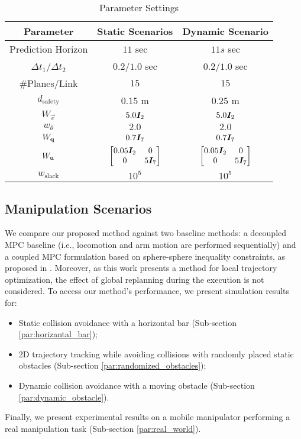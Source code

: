\begin{table}[ht]
  \centering
  \caption{Parameter Settings}
  \label{tab:parameters}
  \begin{tabular}{|c|c|c|}
  \hline
  Parameter & Static Scenarios & Dynamic Scenario\\
  \hline
  Prediction Horizon & $11$ sec & $11s$ sec\\
  \hline
  $\Delta t_1$/$\Delta t_2$ & $0.2$/$1.0$ sec & $0.2$/$1.0$ sec\\
  \hline
  \#Planes/Link & $15$ & $15$ \\
  \hline
  $d_{\textrm{safety}}$ & $0.15$ m & $0.25$ m \\
  \hline
  $W_{\vec{e}}$ & $5.0\bm{I}_2$ & $5.0\bm{I}_2$\\
  \hline
  $w_{\theta}$ & $2.0$ & $2.0$\\
  \hline
  $W_{\mathbf{q}}$ & $0.7 \bm{I}_7$ & $0.7 \bm{I}_7$ \\
  \hline
  $W_{\mathbf{u}}$ & $\begin{bmatrix} 0.05\bm{I}_2 & 0 \\ 0 & 5\bm{I}_7 \end{bmatrix}$ &
  $\begin{bmatrix} 0.05\bm{I}_2 & 0 \\ 0 & 5\bm{I}_7 \end{bmatrix}$ \\
  \hline
  $w_{\textrm{slack}}$ & $10^{5}$ & $10^{5}$\\
  \hline
  \end{tabular}
\end{table}
%
%
\subsection{Manipulation Scenarios}%
\label{sub:environment_setup}

We compare our proposed method against two baseline methods: a decoupled MPC baseline (i.e., locomotion and arm motion are performed sequentially) and a coupled MPC formulation based on sphere-sphere inequality constraints, as proposed in \cite{Avanzini2018}. Moreover, as this work presents a method for local trajectory optimization, the effect of global replanning during the execution is not considered. To access our method's performance, we present simulation results for:
\begin{itemize}
    \item Static collision avoidance with a horizontal bar \cite{Avanzini2018} (Sub-section \ref{par:horizantal_bar});
    \item 2D trajectory tracking while avoiding collisions with randomly placed static obstacles (Sub-section \ref{par:randomized_obstacles});
    \item Dynamic collision avoidance with a moving obstacle (Sub-section \ref{par:dynamic_obstacle}).
\end{itemize} 
Finally, we present experimental results on a mobile manipulator performing a real manipulation task (Sub-section \ref{par:real_world}).


